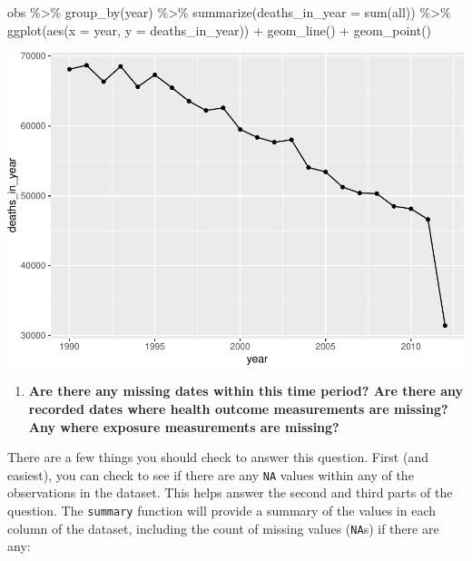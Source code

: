\documentclass[
]{book}
\newenvironment{Shaded}{\begin{snugshade}}{\end{snugshade}}
\newcommand{\AttributeTok}[1]{\textcolor[rgb]{0.77,0.63,0.00}{#1}}
\newcommand{\FunctionTok}[1]{\textcolor[rgb]{0.00,0.00,0.00}{#1}}
\newcommand{\NormalTok}[1]{#1}
\newcommand{\SpecialCharTok}[1]{\textcolor[rgb]{0.00,0.00,0.00}{#1}}
\providecommand{\tightlist}{%
  \setlength{\itemsep}{0pt}\setlength{\parskip}{0pt}}
\begin{document}
\begin{Shaded}
\begin{Highlighting}[]
\NormalTok{obs }\SpecialCharTok{\%\textgreater{}\%} 
  \FunctionTok{group\_by}\NormalTok{(year) }\SpecialCharTok{\%\textgreater{}\%} 
  \FunctionTok{summarize}\NormalTok{(}\AttributeTok{deaths\_in\_year =} \FunctionTok{sum}\NormalTok{(all)) }\SpecialCharTok{\%\textgreater{}\%} 
  \FunctionTok{ggplot}\NormalTok{(}\FunctionTok{aes}\NormalTok{(}\AttributeTok{x =}\NormalTok{ year, }\AttributeTok{y =}\NormalTok{ deaths\_in\_year)) }\SpecialCharTok{+}
  \FunctionTok{geom\_line}\NormalTok{() }\SpecialCharTok{+}
  \FunctionTok{geom\_point}\NormalTok{() }
\end{Highlighting}
\end{Shaded}

\includegraphics{adv_epi_analysis_files/figure-latex/unnamed-chunk-7-1.pdf}

\begin{enumerate}
\def\labelenumi{\arabic{enumi}.}
\setcounter{enumi}{1}
\tightlist
\item
  \textbf{Are there any missing dates within this time period? Are there any recorded
  dates where health outcome measurements are missing?
  Any where exposure measurements are missing?}
\end{enumerate}

There are a few things you should check to answer this question. First
(and easiest), you can check to see if there are any \texttt{NA} values within
any of the observations in the dataset. This helps answer the second and third
parts of the question. The \texttt{summary} function will provide
a summary of the values in each column of the dataset, including the count
of missing values (\texttt{NA}s) if there are any:
\end{document}
